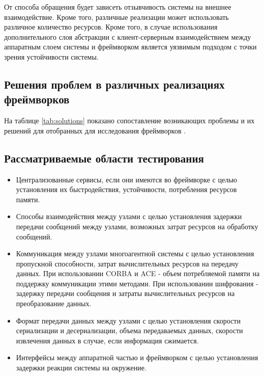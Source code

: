 От способа обращения будет зависеть отзывчивость системы на внешнее взаимодействие. Кроме того, различные реализации может использовать различное количество ресурсов. Кроме того, в случае использования дополнительного слоя абстракции с клиент-серверным взаимодействием между аппаратным слоем системы и фреймворком является уязвимым подходом с точки зрения устойчивости системы.

\subsection{Решения проблем в различных реализациях фреймворков}

На таблице \ref{tab:solutions} показано сопоставление возникающих проблемы и их решений для отобранных для исследования фреймворков \cite{blasco2012multiagent,bruyninckx2001orocos,einhorn2012mira,metta2006yarp,mohamed2008survey,elkady2012comprehensive}.

\subsection{Рассматриваемые области тестирования}
\begin{itemize}
	\item Централизованные сервисы, если они имеются во фреймворке с целью установления их быстродействия, устойчивости, потребления ресурсов памяти.
	\item Способы взаимодействия между узлами с целью установления задержки передачи сообщений между узлами, возможных затрат ресурсов на обработку сообщений.
	\item Коммуникация между узлами многоагентной системы с целью установления пропускной способности, затрат вычислительных ресурсов на передачу данных. При использовании CORBA и ACE - объем потребляемой памяти на поддержку коммуникации этими методами. При использовании шифрования - задержку передачи сообщения и затраты вычислительных ресурсов на преобразование данных.
	\item Формат передачи данных между узлами с целью установления скорости сериализации и десериализации, объема передаваемых данных, скорости извлечения данных в случае, если информация сжимается.
	\item Интерфейсы между аппаратной частью и фреймворком с целью установления задержки реакции системы на окружение.	
\end{itemize}
